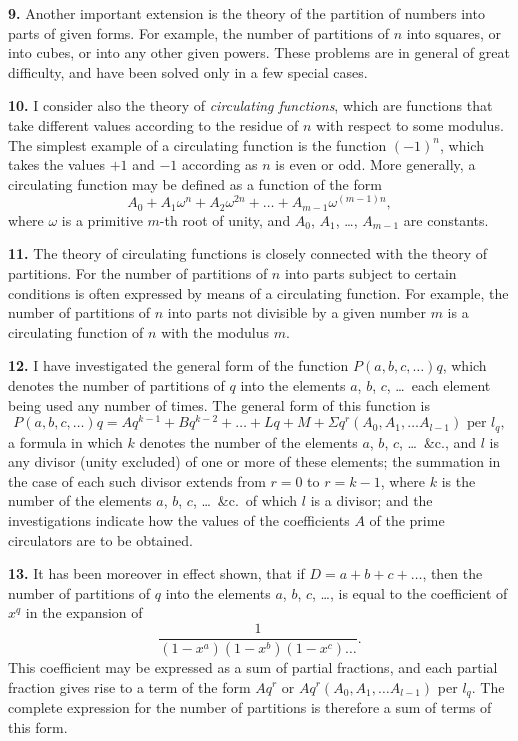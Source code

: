 \documentclass[12pt,a4paper]{article}
\begin{document}
\textbf{9.} Another important extension is the theory of the partition of numbers into parts of given forms. For example, the number of partitions of $n$ into squares, or into cubes, or into any other given powers. These problems are in general of great difficulty, and have been solved only in a few special cases.

\textbf{10.} I consider also the theory of \textit{circulating functions}, which are functions that take different values according to the residue of $n$ with respect to some modulus. The simplest example of a circulating function is the function $(-1)^n$, which takes the values $+1$ and $-1$ according as $n$ is even or odd. More generally, a circulating function may be defined as a function of the form
\[
A_0 + A_1 \omega^n + A_2 \omega^{2n} + \ldots + A_{m-1} \omega^{(m-1)n},
\]
where $\omega$ is a primitive $m$-th root of unity, and $A_0$, $A_1$, \ldots, $A_{m-1}$ are constants.

\newpage
\setcounter{page}{238}

\textbf{11.} The theory of circulating functions is closely connected with the theory of partitions. For the number of partitions of $n$ into parts subject to certain conditions is often expressed by means of a circulating function. For example, the number of partitions of $n$ into parts not divisible by a given number $m$ is a circulating function of $n$ with the modulus $m$.

\textbf{12.} I have investigated the general form of the function $P(a, b, c, \ldots)q$, which denotes the number of partitions of $q$ into the elements $a$, $b$, $c$, \ldots\ each element being used any number of times. The general form of this function is
\[
P(a, b, c, \ldots)q = Aq^{k-1} + Bq^{k-2} + \ldots + Lq + M + \Sigma q^r (A_0, A_1, \ldots A_{l-1}) \text{ per } l_q,
\]
a formula in which $k$ denotes the number of the elements $a$, $b$, $c$, \ldots\ \&c., and $l$ is any divisor (unity excluded) of one or more of these elements; the summation in the case of each such divisor extends from $r = 0$ to $r = k-1$, where $k$ is the number of the elements $a$, $b$, $c$, \ldots\ \&c.\ of which $l$ is a divisor; and the investigations indicate how the values of the coefficients $A$ of the prime circulators are to be obtained.

\newpage
\setcounter{page}{239}

\textbf{13.} It has been moreover in effect shown, that if $D = a + b + c + \ldots$, then the number of partitions of $q$ into the elements $a$, $b$, $c$, \ldots, is equal to the coefficient of $x^q$ in the expansion of
\[
\frac{1}{(1-x^a)(1-x^b)(1-x^c)\ldots}.
\]
This coefficient may be expressed as a sum of partial fractions, and each partial fraction gives rise to a term of the form $Aq^r$ or $Aq^r(A_0, A_1, \ldots A_{l-1})$ per $l_q$. The complete expression for the number of partitions is therefore a sum of terms of this form.
\end{document}
